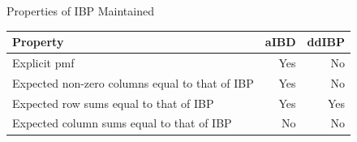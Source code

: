 \documentclass[serif,mathserif,final]{beamer}
\begin{document}
\begin{frame}{}
\begin{columns}[t]
\begin{column}{0.4\linewidth}
           \begin{block}{Properties of IBP Maintained}
        \vspace{.5em}
        \begin{center}
          \begin{tabular}{lrr}
            \toprule
            \textbf{Property} & \textbf{aIBD} & \textbf{ddIBP} \\ \midrule
            Explicit pmf & {\color{red}Yes} & {\color{red}No} \\
            Expected non-zero columns equal to that of IBP & {\color{red}Yes} & {\color{red}No} \\
              Expected row sums equal to that of IBP & Yes & Yes \\
              Expected column sums equal to that of IBP & No & No \\
            \bottomrule
          \end{tabular}
        \end{center}
      \end{block}

\vspace{1em}


\end{column}
\end{columns}
\end{frame}
\end{document}
